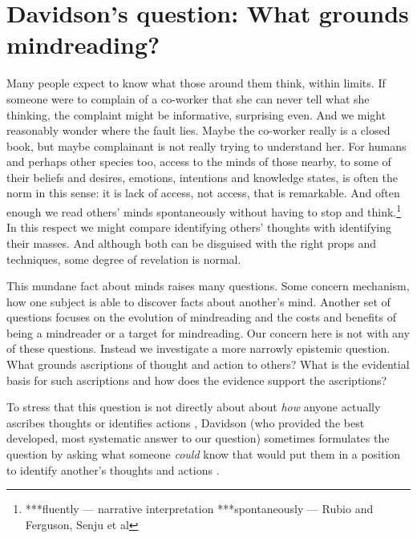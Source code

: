 \documentclass[12pt,a4paper]{extarticle}
\begin{document}
\setlength\footnotesep{1em}


\maketitle

\begin{abstract}
***
\end{abstract}


\section{Davidson's question: What grounds mindreading?}
Many people expect to know what those around them think, within limits.
If someone were to complain of a co-worker that she can never tell what she  thinking,
the complaint might be informative, surprising even.
And we might reasonably wonder where the fault lies.
Maybe the co-worker really is a closed book,
but maybe complainant is not really trying to understand her.
For humans and perhaps other species too,
access to the minds of those nearby,
to some of their beliefs and desires,
emotions, intentions and knowledge states,
is often the norm in this sense: it is lack of access, not access, that is remarkable.
And often enough we read others' minds spontaneously
without having to stop and think.\footnote{
***fluently --- narrative interpretation
***spontaneously --- Rubio and Ferguson, Senju et al
}
In this respect we might compare identifying others' thoughts with identifying their masses.
And although both can be disguised with the right props and techniques, some degree of revelation is normal.

This mundane fact about minds raises many questions.
Some concern mechanism, how one subject is able to discover facts about another's mind.
Another set of questions focuses on the evolution of mindreading and the costs and benefits of being a mindreader or a target for mindreading.
Our concern here is not with any of these questions.
Instead we investigate a more narrowly epistemic question.
What grounds ascriptions of thought and action to others?
What is the evidential basis for such ascriptions and how does the evidence support the ascriptions?

To stress that this question is not directly about about \emph{how} anyone actually ascribes thoughts or identifies actions%
, Davidson (who provided the best developed, most systematic answer to our question)
sometimes formulates the question by asking what someone \emph{could} know that would put them in a position to identify another's thoughts and actions \citep[e.g.][p.\ 126]{Davidson:1973jx}.
\end{document}
